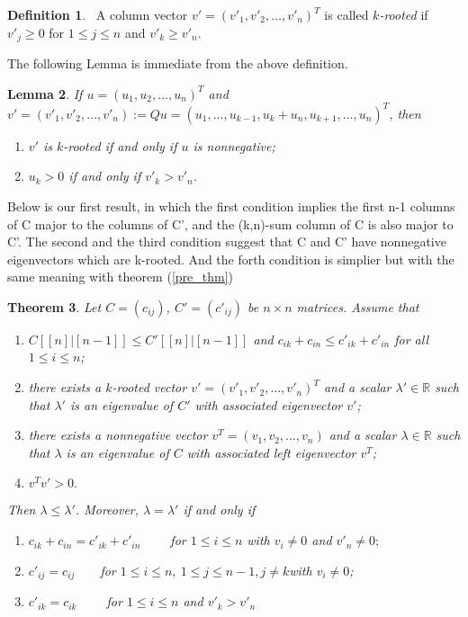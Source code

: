 \documentclass{article}
\theoremstyle{plain}
\newtheorem{thm}{Theorem}[section]
\newtheorem{lem}[thm]{Lemma}
\theoremstyle{definition}
\newtheorem{defn}[thm]{Definition}
\begin{document}
\begin{defn}%
~A column vector $v'=(v'_1,v'_2,\ldots,v'_n)^T$ is called {\it $k$-rooted}  if $v'_{j} \geq 0$ for $1 \leq  j \leq n$ and $v'_k\geq v'_n.$
\end{defn}
\bigskip

The following Lemma is immediate from the above definition.%
\bigskip

\begin{lem}\label{lem:rt_vec}
If $u=(u_1, u_2, \ldots, u_n)^T$ and $v'=(v'_1, v'_2, \ldots, v'_n):=Qu=(u_1,\ldots, u_{k-1},u_k+u_n, u_{k+1}, \ldots,  u_n)^T$, then
\begin{enumerate}[label=(\roman*)]
\item \label{lem:rt_vec:en1}$v'$ is $k$-rooted  if and only if  $u$ is nonnegative;
\item $u_k>0$ if and only if $v'_k>v'_n$.
\end{enumerate}
\end{lem}

Below is our first result, in which the first condition implies the first n-1 columns of C major to
 the columns of C', and the (k,n)-sum column of C is also major to C'. The second and the third condition
 suggest that C and C' have nonnegative eigenvectors which are k-rooted. And the forth condition is simplier
  but with the same meaning with theorem (\ref{pre_thm})
\begin{thm}\label{thm_main}
    Let $C=(c_{ij})$, $C'=(c'_{ij})$ be  $n\times n$ matrices.
Assume that
\begin{enumerate}[label=(\roman*)]
\item \label{thm_main:condition_i} $C[[n]|[n-1]]\leq C'[[n]|[n-1]]$ and $c_{ik}+c_{in}\leq c'_{ik}+c'_{in}$ for all $1\leq i\leq n$;
\item \label{thm_main:condition_ii} there exists a $k$-rooted vector $v'=(v'_1, v'_2, \ldots, v'_n)^T$ and a scalar $\lambda'\in \mathbb{R}$
such that $\lambda'$ is an eigenvalue of $C'$ with associated eigenvector $v'$;
\item \label{thm_main:condition_iii}there exists a nonnegative vector $v^T=(v_1, v_2, \ldots, v_n)$ and a scalar $\lambda\in \mathbb{R}$ such that $\lambda$ is an eigenvalue of $C$ with associated left eigenvector $v^T$;
\item \label{thm_main:condition_iv}$v^Tv'>0.$
\end{enumerate}
 Then $\lambda\leq \lambda'$.
Moreover, $\lambda=\lambda'$
if and only if
\begin{enumerate}[label=(\alph*)]
    \item \label{thm_main:equ_cond_a} $c_{ik}+c_{in}=c'_{ik}+c'_{in} \qquad$  for $1\leq i\leq n$ with $v_i\not=0$ and $v'_n\not=0;$
    \item \label{thm_main:equ_cond_b} $c'_{ij}=c_{ij}\qquad $for $1\leq i\leq n,~1\leq j\leq n-1, j \neq k $with $v_i\ne 0 $;
    \item \label{thm_main:equ_cond_c} $c'_{ik}=c_{ik} \qquad $  for $1\leq i \leq n$ and $ v'_{k}>v'_n$ 
\end{enumerate} %
\end{thm}
% 
\end{document}
